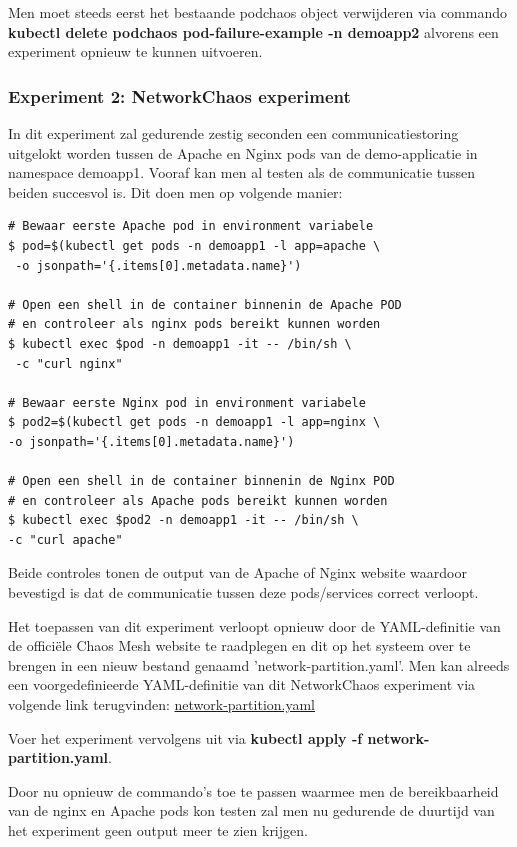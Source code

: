 Men moet steeds eerst het bestaande podchaos object verwijderen via commando {\bf kubectl delete podchaos pod-failure-example -n demoapp2} alvorens een experiment opnieuw te kunnen uitvoeren. 

\subsubsection{Experiment 2: NetworkChaos experiment}

In dit experiment zal gedurende zestig seconden een communicatiestoring uitgelokt worden tussen de Apache en Nginx pods van de demo-applicatie in namespace demoapp1. Vooraf kan men al testen als de communicatie tussen beiden succesvol is. Dit doen men op volgende manier: 
\begin{lstlisting}
# Bewaar eerste Apache pod in environment variabele
$ pod=$(kubectl get pods -n demoapp1 -l app=apache \
 -o jsonpath='{.items[0].metadata.name}')

# Open een shell in de container binnenin de Apache POD
# en controleer als nginx pods bereikt kunnen worden
$ kubectl exec $pod -n demoapp1 -it -- /bin/sh \
 -c "curl nginx"
 
# Bewaar eerste Nginx pod in environment variabele
$ pod2=$(kubectl get pods -n demoapp1 -l app=nginx \
-o jsonpath='{.items[0].metadata.name}')

# Open een shell in de container binnenin de Nginx POD
# en controleer als Apache pods bereikt kunnen worden
$ kubectl exec $pod2 -n demoapp1 -it -- /bin/sh \
-c "curl apache"
\end{lstlisting}

Beide controles tonen de output van de Apache of Nginx website waardoor bevestigd is dat de communicatie tussen deze pods/services correct verloopt. 

Het toepassen van dit experiment verloopt opnieuw door de YAML-definitie van de officiële Chaos Mesh website te raadplegen en dit op het systeem over te brengen in een nieuw bestand genaamd 'network-partition.yaml'.
\newline Men kan alreeds een voorgedefinieerde YAML-definitie van dit NetworkChaos experiment via volgende link terugvinden: \href{https://github.com/KenBruggeman/BP_21-22/blob/master/bachelorproef/docs/chaosmesh-experimenten/network-partition.yaml}{network-partition.yaml}

Voer het experiment vervolgens uit via {\bf kubectl apply -f network-partition.yaml}. 

Door nu opnieuw de commando's toe te passen waarmee men de bereikbaarheid van de nginx en Apache pods kon testen zal men nu gedurende de duurtijd van het experiment geen output meer te zien krijgen. 

